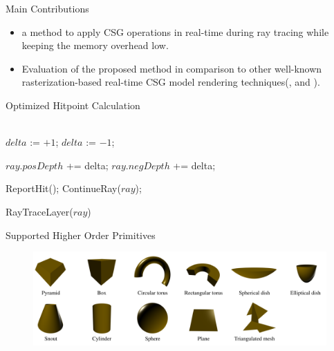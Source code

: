 \documentclass{beamer}
\newcommand{\BLUECOMMENT}[1]{\color{blue}{#1}\color{black}}
\begin{document}
\begin{frame}{Main Contributions}
	\begin{itemize}
		\item a method to apply CSG operations in real-time during ray tracing while keeping the memory overhead low.
		\item Evaluation of the proposed method in comparison to other well-known rasterization-based real-time CSG model rendering techniques(\cite{goldfeather:86:FCSGDPPGS}, and \cite{Stewart02linear-timecsg}).
	\end{itemize}
\end{frame}

\begin{frame}{Optimized Hitpoint Calculation}
	\begin{algorithm}[H]
		\BLUECOMMENT {$ray$: current ray hitting a primitive}\\
		\vspace{0.5mm}
			{ $delta$ := $+1$; }
			{ $delta$ := $-1$; }

			{ $ray.posDepth$ += delta;  }
			{ $ray.negDepth$ += delta;  }

			{ ReportHit(); \BLUECOMMENT{ // final hit in layer found } }
			{ ContinueRay($ray$); \BLUECOMMENT{ // still inside a negative medium } }		
		\caption{RayTraceLayer($ray$)}
		\label{alg:ray-trace-layer}
	\end{algorithm}
\end{frame}

\begin{frame}{Supported Higher Order Primitives}
	
	\begin{figure}[ht!]
		\centering
		\includegraphics[width=0.9\linewidth]{figures/hops.png}
	\end{figure}
\end{frame}
\end{document}
